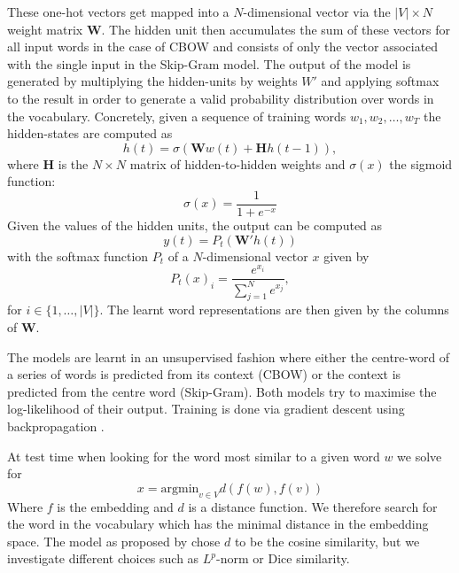 \documentclass[conference]{IEEEtran}
\begin{document}
These one-hot vectors get mapped into a $N$-dimensional vector via the $|V| \times N$ weight matrix
$\boldsymbol{W}$.  The hidden unit then accumulates the sum of these vectors for all input
words in the case of CBOW and consists of only the vector associated with the single input in the 
Skip-Gram model. The output of the model is generated by multiplying the hidden-units by
weights $W'$ and applying softmax to the result in order to generate a valid
probability distribution over words in the vocabulary. Concretely, given a sequence of 
training words $w_1, w_2, \dots , w_T$ the hidden-states are computed as
\begin{equation}
	h(t) = \sigma (\boldsymbol{W}w(t) + \boldsymbol{H}h(t-1)),
\end{equation}
where $\boldsymbol{H}$ is the $N \times N$ matrix of hidden-to-hidden weights and 
$\sigma (x)$ the sigmoid function:  
\begin{equation}
	\sigma (x) = \frac{1}{1+e^{-x}} 
\end{equation}
Given the values of the hidden units, the output can be computed as
\begin{equation}
	y(t) = P_t(\boldsymbol{W'}h(t))
\end{equation}
with the softmax function $P_t$ of a $N$-dimensional vector $x$ given by 
\begin{equation}
	P_t(x)_i = \frac{e^{x_i}}{\sum_{j=1}^{N}{e^{x_j}}},
\end{equation}
for $i \in \{1, \hdots , |V|\}$.
The learnt word representations are then given by the columns of $\boldsymbol{W}$.

The models are learnt in an unsupervised fashion where either the centre-word of
a series of words is predicted from its context (CBOW) or the context is
predicted from the centre word (Skip-Gram). Both models try to maximise the
log-likelihood of their output. Training is done via gradient descent using backpropagation
\cite{rumelhart1988learning}.

At test time when looking for the word most similar to a given word $w$ we solve for 
\begin{equation}
	x = \text{argmin}_{v \in V} d(f(w),f(v))
\end{equation}
Where $f$ is the embedding and $d$ is a distance function. We therefore search for the 
word in the vocabulary which has the minimal distance in the embedding space. The 
model as proposed by \cite{mikolov2013efficient} chose $d$ to be the cosine similarity, 
but we investigate different choices such as $L^p$-norm or Dice similarity.
\end{document}

